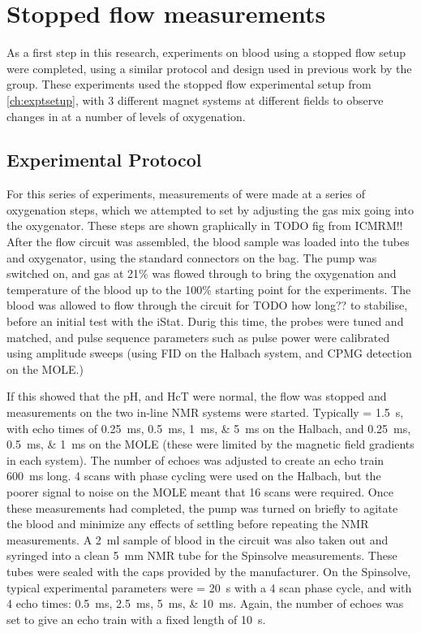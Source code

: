 \chapter{Stopped flow \SOtwo measurements}\label{ch:stoppedflow}

As a first step in this research, experiments on blood using a stopped flow setup were completed, using a similar protocol and design used in previous work by the group.
These experiments used the stopped flow experimental setup from \autoref{ch:exptsetup}, with 3 different magnet systems at different fields to observe changes in \Ttwo at a number of levels of oxygenation.

\section{Experimental Protocol}
For this series of experiments, measurements of \Ttwo were made at a series of oxygenation steps, which we attempted to set by adjusting the gas mix going into the oxygenator.
These steps are shown graphically in TODO fig from ICMRM!!
After the flow circuit was assembled, the blood sample was loaded into the tubes and oxygenator, using the standard connectors on the bag.
The pump was switched on, and gas at 21\% \Otwo was flowed through to bring the oxygenation and temperature of the blood up to the 100\% starting point for the experiments.
The blood was allowed to flow through the circuit for TODO how long?? to stabilise, before an initial test with the iStat.
Durig this time, the probes were tuned and matched, and pulse sequence parameters such as pulse power were calibrated using amplitude sweeps (using FID on the Halbach system, and CPMG detection on the MOLE.)

If this showed that the pH, \SOtwo and HcT were normal, the flow was stopped and measurements on the two in-line NMR systems were started.
Typically \TR = \SI{1.5}{s}, with echo times of \SIlist{0.25;0.5;1;5}{ms} on the Halbach, and \SIlist{0.25; 0.5; 1}{ms} on the MOLE (these were limited by the magnetic field gradients in each system).
The number of echoes was adjusted to create an echo train \SI{600}{ms} long.
4 scans with phase cycling were used on the Halbach, but the poorer signal to noise on the MOLE meant that 16 scans were required.
Once these measurements had completed, the pump was turned on briefly to agitate the blood and minimize any effects of settling before repeating the NMR measurements.
A \SI{2}{ml} sample of blood in the circuit was also taken out and syringed into a clean \SI{5}{mm} NMR tube for the Spinsolve measurements.
These tubes were sealed with the caps provided by the manufacturer.
On the Spinsolve, typical experimental parameters were \TR = \SI{20}{s} with a 4 scan phase cycle, and with 4 echo times: \SIlist{0.5;2.5;5;10}{ms}.
Again, the number of echoes was set to give an echo train with a fixed length of \SI{10}{s}.

